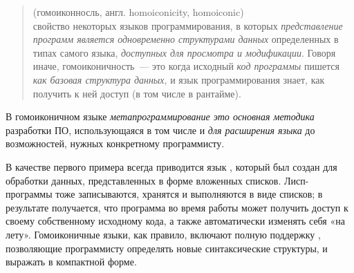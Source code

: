 {}\label{homoiconic}

\begin{quotation}\noindent
{} (гомоиконносль, англ. homoiconicity, homoiconic)\\
свойство некоторых языков программирования, в которых \emph{представление
программ является одновременно структурами данных} определенных в типах самого
языка, \emph{доступных для просмотра и модификации}. Говоря иначе,
гомоиконичность\ --- это когда исходный \textit{код программы} пишется
\textit{как базовая структура данных}, и язык программирования знает, как
получить к ней доступ (в том числе в рантайме).
\end{quotation}

\noindent
В гомоиконичном языке \textit{метапрограммирование это основная методика}
разработки ПО, использующаяся в том числе и \textit{для расширения языка} до
возможностей, нужных конкретному программисту.

В качестве первого примера всегда приводится язык \lisp, который был создан для
обработки данных, представленных в форме вложенных списков.
Лисп-программы тоже записываются, хранятся и выполняются в виде списков; в
результате получается, что программа во время работы может получить доступ к
своему собственному исходному кода, а также автоматически изменять себя «на
лету». Гомоиконичные языки, как правило, включают полную поддержку
, позволяющие программисту определять новые
синтаксические структуры, и выражать  в компактной
форме.
